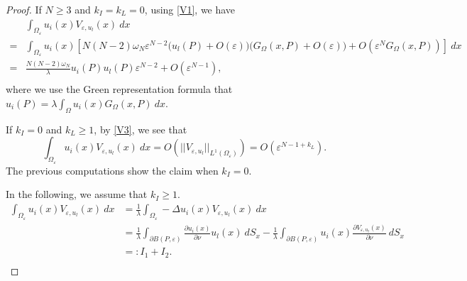 \documentclass[11pt,reqno]{article}
\numberwithin{equation}{section}
\newcommand\e\varepsilon
\newcommand\la\lambda
\renewcommand\o\omega
\renewcommand\O\Omega
\begin{document}
        \begin{proof}
       If  $N\ge3$ and  ${ k_I}={ k_L}=0$, using  \eqref{V1}, we have 
        \begin{equation}
            \begin{aligned}
             & \int_{\O_\e}u_i(x) V_{\e,u_l}(x)\ dx\\
              =  &\int_{\O_\e}u_i(x)\left[N(N-2)\o_N\e^{N-2}\big(u_l(P)+O(\e)\big)\big(G_\O(x,P)+O(\e)\big)+O(\e^NG_\O(x,P))\right]\ dx\\
              =&\frac{N(N-2)\o_N}{\lambda}u_i(P)u_l(P)\e^{N-2}+O(\e^{N-1}),\\
            \end{aligned}
        \end{equation}
        where we use the Green representation formula that $u_i(P)=\lambda\int_{\O}u_i(x)G_\O(x,P)\ dx$. 
        
        If ${ k_I}=0$ and ${ k_L}\ge 1$, by  \eqref{V3}, we see that 
        \begin{equation}
            \int_{\O_\e}u_i(x) V_{\e,u_l}(x)\ dx=O\left(||V_{\e,u_l}||_{L^1(\O_\e)}\right)=O(\e^{N-1+{ k_L}}).
        \end{equation}
        The previous computations show the claim when ${ k_I}=0$. 
        
        In the following, we assume that ${ k_I}\ge1$.
        \begin{equation}\label{eq27102025-0}
            \begin{aligned}
                \int_{\O_\e}u_i(x) V_{\e,u_l}(x)\ dx&=\frac{1}{\la}\int_{\O_\e}-\Delta u_i(x) V_{\e,u_l}(x)\ dx\\
                 &=\frac{1}{\la}\int_{\partial B(P,\e)} \frac{\partial u_i (x)}{\partial \nu} u_l(x)\ d S_x-\frac{1}{\la}\int_{\partial B(P,\e)} u_i (x)\frac{\partial V_{\e,u_l}(x) }{\partial \nu}\ d S_x\\
                 &=:I_1+I_2.\\
            \end{aligned}
        \end{equation}
      

\end{proof}
\end{document}
